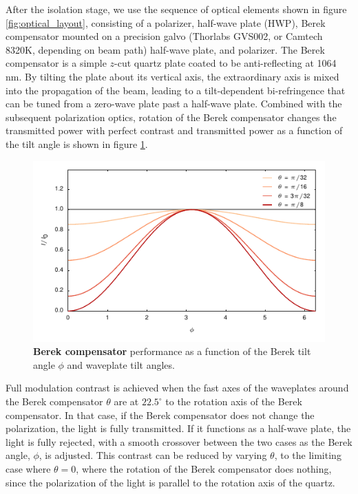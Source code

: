 \documentclass[twocolumn,aps,pra,showpacs,preprintnumbers,bibnotes]{revtex4-1}
\begin{document}
After the isolation stage, we use the sequence of optical elements shown in figure \ref{fig:optical_layout}, consisting of a polarizer, half-wave plate (HWP), Berek compensator mounted on a precision galvo (Thorlabs GVS002, or Camtech 8320K, depending on beam path) half-wave plate, and polarizer. 
The Berek compensator is a simple $z$-cut quartz plate coated to be anti-reflecting at 1064 nm. 
By tilting the plate about its vertical axis, the extraordinary axis is mixed into the propagation of the beam, leading to a tilt-dependent bi-refringence that can be tuned from a zero-wave plate past a half-wave plate.
Combined with the subsequent polarization optics, rotation of the Berek compensator changes the transmitted power with perfect contrast and transmitted power as a function of the tilt angle is shown in figure \ref{fig:berek}.
\begin{figure}
  \begin{center}
    \includegraphics{fig/berek_sim.pdf}
    \caption{\textbf{Berek compensator} performance as a function of the Berek tilt angle $\phi$ and waveplate tilt angles.}\label{fig:berek}
  \end{center}
\end{figure}
Full modulation contrast is achieved when the fast axes of the waveplates around the Berek compensator $\theta$ are at $22.5^\circ$ to the rotation axis of the Berek compensator.
In that case, if the Berek compensator does not change the polarization, the light is fully transmitted. 
If it functions as a half-wave plate, the light is fully rejected, with a smooth crossover between the two cases as the Berek angle, $\phi$, is adjusted.
This contrast can be reduced by varying $\theta$, to the limiting case where $\theta=0$, where the rotation of the Berek compensator does nothing, since the polarization of the light is parallel to the rotation axis of the quartz.
\end{document}
